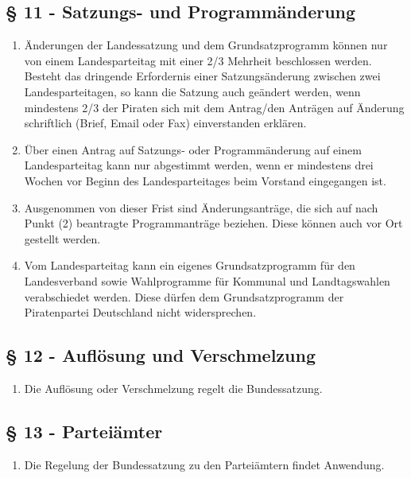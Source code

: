 \documentclass[draft,a4paper,10pt]{article}
\begin{document}
\subsection{§ 11 - Satzungs- und Programmänderung}
\begin{enumerate}
\item Änderungen der Landessatzung und dem Grundsatzprogramm können nur von
einem Landesparteitag mit einer 2/3 Mehrheit beschlossen werden. Besteht das
dringende Erfordernis einer Satzungsänderung zwischen zwei Landesparteitagen, so
kann die Satzung auch geändert werden, wenn mindestens 2/3 der Piraten sich mit
dem Antrag/den Anträgen auf Änderung schriftlich (Brief, Email oder Fax)
einverstanden erklären.

\item Über einen Antrag auf Satzungs- oder Programmänderung auf einem
Landesparteitag kann nur abgestimmt werden, wenn er mindestens drei Wochen vor
Beginn des Landesparteitages beim Vorstand eingegangen ist.

\item Ausgenommen von dieser Frist sind Änderungsanträge, die sich auf nach
Punkt (2) beantragte Programmanträge beziehen. Diese können auch vor Ort
gestellt werden.

\item Vom Landesparteitag kann ein eigenes Grundsatzprogramm für den
Landesverband sowie Wahlprogramme für Kommunal und Landtagswahlen verabschiedet
werden. Diese dürfen dem Grundsatzprogramm der Piratenpartei Deutschland nicht
widersprechen.
\end{enumerate}

\subsection{§ 12 - Auflösung und Verschmelzung}
\begin{enumerate}
\item Die Auflösung oder Verschmelzung regelt die Bundessatzung. 
\end{enumerate}

\subsection{§ 13 - Parteiämter}
\begin{enumerate}
\item Die Regelung der Bundessatzung zu den Parteiämtern findet Anwendung. 
\end{enumerate}
\end{document}
